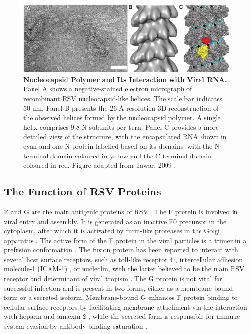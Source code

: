 \begin{figure}
    \centering
    \includegraphics[width=1\linewidth]{04. Introduction//Figs/08. N-structure.jpeg}
    \caption[Nucleocapsid Polymer and Its Interaction with Viral RNA.]{\textbf{Nucleocapsid Polymer and Its Interaction with Viral RNA.} Panel A shows a negative-stained electron micrograph of recombinant RSV nucleocapsid-like helices. The scale bar indicates 50 nm. Panel B presents the 26 \r{A}-resolution 3D reconstruction of the observed helices formed by the nucleocapsid polymer. A single helix comprises 9.8 N subunits per turn. Panel C provides a more detailed view of the structure, with the encapsulated RNA shown in cyan and one N protein labelled based on its domains, with the N-terminal domain coloured in yellow and the C-terminal domain coloured in red. Figure adapted from Tawar, 2009 \cite{Tawar2009CrystalVirus}.}
    \label{fig:Nucleocapsid Polymer and Its Interaction with Viral RNA}
\end{figure}

\subsection{The Function of RSV Proteins} \label{subsec:The Function of RSV Proteins}
F and G are the main antigenic proteins of RSV \cite{Collins2011ProgressYears, Battles2019RespiratoryIt}. The F protein is involved in viral entry and assembly. It is generated as an inactive F0 precursor in the cytoplasm, after which it is activated by furin-like proteases in the Golgi apparatus \cite{Collins1984NucleotideVirus.}. The active form of the F protein in the viral particles is a trimer in a prefusion conformation \cite{Ternette2007ImmunogenicityVirus}. The fusion protein has been reported to interact with several host surface receptors, such as toll-like receptor 4 \cite{Marr2012RoleReplication}, intercellular adhesion molecule-1 (ICAM-1) \cite{Behera2001BlockingInfection}, or nucleolin, with the latter believed to be the main RSV receptor and determinant of viral tropism \cite{Tayyari2011IdentificationVirus}. The G protein is not vital for successful infection and is present in two forms, either as a membrane-bound form or a secreted isoform. Membrane-bound G enhances F protein binding to cellular surface receptors by facilitating membrane attachment via the interaction with heparin and annexin 2 \cite{Collins2013RespiratoryDisease, Krusat1997Heparin-dependentCells, Malhotra2003IsolationCells}, while the secreted form is responsible for immune system evasion by antibody binding saturation \cite{Bukreyev2008TheLeukocytes}.

